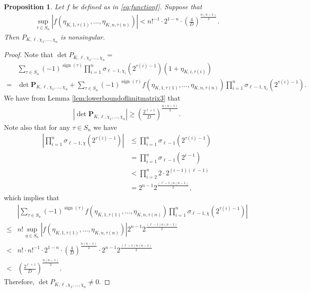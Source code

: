\documentclass[11pt,letterpaper,reqno]{amsart}
\numberwithin{figure}{section}
\numberwithin{table}{section}
\theoremstyle{definition}
\theoremstyle{plain}
\newtheorem{proposition}[theorem]{Proposition}
\theoremstyle{definition}
\theoremstyle{definition}
\theoremstyle{remark}
\numberwithin{equation}{section}
\theoremstyle{remark}
\DeclareMathOperator{\sign}{sign}
\begin{document}
\begin{proposition}
    Let $f$ be defined as in \eqref{eq:functionf}.  Suppose that 
    \begin{align}
        \sup_{\tau\in S_n}|f(\eta_{K,1,\tau(1)},...,\eta_{K,n,\tau(n)})|<n!^{-1}\cdot2^{1-n}\cdot\left(\frac{4}{D}\right)^{\frac{n(n-1)}{2}}.\label{eq:criterion3}
    \end{align}
    Then $P_{K,\ell,\chi_1,...,\chi_n}$ is nonsingular.
\end{proposition}
\begin{proof}
Note that $\det P_{K,\ell,\chi_1,...,\chi_n}=$
    \begin{align*}
        &\sum_{\tau\in S_n}(-1)^{\sign(\tau)}\prod_{i=1}^n\sigma_{\ell-1,\chi_i}(2^{\tau(i)-1})(1+\eta_{K,i,\tau(i)})\\=&\det \mathbf{P}_{K,\ell,\chi_1,...,\chi_n}+\sum_{\tau\in S_n}(-1)^{\sign(\tau)}f(\eta_{K,1,\tau(1)},...,\eta_{K,n,\tau(n)})\prod_{i=1}^n\sigma_{\ell-1,\chi_i}(2^{\tau(i)-1}).
    \end{align*}
  We have from Lemma \ref{lem:lowerboundoflimitmatrix3} that  
\begin{align*}
\left|\det \mathbf{P}_{K,\ell,\chi_1,...,\chi_n}\right|\geq\left(\frac{2^{\ell+1}}{D}\right)^{\frac{n(n-1)}{2}}.
   \end{align*}
 Note  also  that for any $\tau\in S_n$ we have 
\begin{align*}
    \left|\prod_{i=1}^n\sigma_{\ell-1,\chi}(2^{\tau(i)-1}) \right|&\leq\prod_{i=1}^n\sigma_{\ell-1}(2^{\tau(i)-1})\\&=\prod_{i=1}^n\sigma_{\ell-1}(2^{i-1})\\& < \prod_{i=2}^n2\cdot2^{(i-1)(\ell-1)}\\&=2^{n-1}2^{\frac{(\ell-1)n(n-1)}{2}},
\end{align*}
 which implies that
   \begin{align*}
       &\left|\sum_{\tau\in S_n}(-1)^{\sign(\tau)}f(\eta_{K,1,\tau(1)},...,\eta_{K,n,\tau(n)})\prod_{i=1}^n\sigma_{\ell-1,\overline{\chi}}(2^{\tau(i)-1})\right|\\\leq & n! \sup_{\eta\in S_n}|f(\eta_{K,1,\tau(1)},...,\eta_{K,n,\tau(n)})|2^{n-1}2^{\frac{(\ell-1)n(n-1)}{2}}\\ <&n!\cdot n!^{-1}\cdot2^{1-n}\cdot\left(\frac{4}{D}\right)^{\frac{n(n-1)}{2}}\cdot 2^{n-1}2^{\frac{(\ell-1)n(n-1)}{2}}\\<&\left(\frac{2^{\ell+1}}{D}\right)^{\frac{n(n-1)}{2}}.
   \end{align*}
   Therefore,  $\det P_{K,\ell,\chi_1,...,\chi_n}\neq 0$.
\end{proof}
\end{document}
